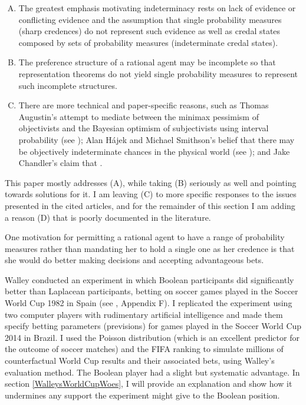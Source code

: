 \documentclass[11pt]{article}
\begin{document}
\begin{enumerate}[(A)]
\item The greatest emphasis motivating indeterminacy rests on lack of
  evidence or conflicting evidence and the assumption that single
  probability measures (sharp credences) do not represent such
  evidence as well as credal states composed by sets of probability
  measures (indeterminate credal states).
\item The preference structure of a rational agent may be incomplete
  so that representation theorems do not yield single probability
  measures to represent such incomplete structures.
\item There are more technical and paper-specific reasons, such as
  Thomas Augustin's attempt to mediate between the minimax pessimism
  of objectivists and the Bayesian optimism of subjectivists using
  interval probability (see ); Alan
  H{\'a}jek and Michael Smithson's belief that there may be
  objectively indeterminate chances in the physical world (see
  ); and Jake Chandler's claim that
   .
\end{enumerate}

This paper mostly addresses (A), while taking (B) seriously as well
and pointing towards solutions for it. I am leaving (C) to more
specific responses to the issues presented in the cited articles, and
for the remainder of this section I am adding a reason (D) that is
poorly documented in the literature.

One motivation for permitting a rational agent to have a range of
probability measures rather than mandating her to hold a single one as
her credence is that she would do better making decisions and
accepting advantageous bets. 

Walley conducted an experiment in which Boolean participants did
significantly better than Laplacean participants, betting on soccer
games played in the Soccer World Cup 1982 in Spain (see
, Appendix F). I replicated
the experiment using two computer players with rudimentary artificial
intelligence and made them specify betting parameters (previsions) for
games played in the Soccer World Cup 2014 in Brazil. I used the
Poisson distribution (which is an excellent predictor for the outcome
of soccer matches) and the FIFA ranking to simulate millions of
counterfactual World Cup results and their associated bets, using
Walley's evaluation method. The Boolean player had a slight but
systematic advantage. In section \ref{WalleysWorldCupWoes}, I will
provide an explanation and show how it undermines any support the
experiment might give to the Boolean position. 
\end{document}
